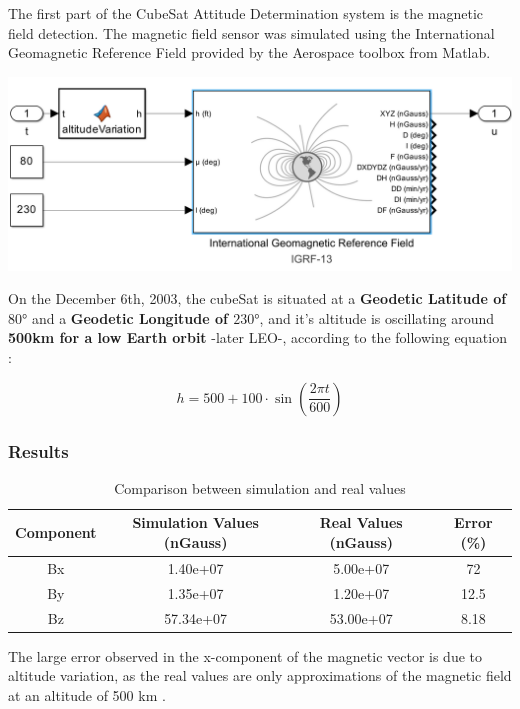 \documentclass[a4paper, 12pt]{article}
\begin{document}
\begin{minipage}{0.3\textwidth}

The first part of the CubeSat Attitude Determination system is the magnetic field detection. The magnetic field sensor was simulated using the International Geomagnetic Reference Field provided by the Aerospace toolbox from Matlab. 


\end{minipage}
\hfill
\begin{minipage}{0.6\textwidth}
    \centering
    \includegraphics[width=\linewidth]{fig/magneticSys.png}
    \label{fig:Magnetic system on Simulink}
\end{minipage}

\vspace{1cm}

On the December 6th, 2003, the cubeSat is situated at a \textbf{Geodetic Latitude of $80°$} and a \textbf{Geodetic Longitude of $230°$}, and it's altitude is oscillating around \textbf{500km for a low Earth orbit} -later LEO-, according to the following equation :

\begin{equation}
h = 500 + 100 \cdot \sin\left( \frac{2\pi t}{600} \right)
\end{equation}


\subsubsection{Results}

\begin{table}[h!]
\centering
\begin{tabular}{|c|c|c|c|}
\hline
\textbf{Component}&\textbf{Simulation Values (nGauss)} & \textbf{Real Values (nGauss)} & \textbf{Error (\%)} \\
\hline
Bx & 1.40e+07 & 5.00e+07 & 72 \\
\hline
By & 1.35e+07  & 1.20e+07  & 12.5 \\
\hline
Bz & 57.34e+07 & 53.00e+07 & 8.18 \\
\hline
\end{tabular}
\caption{Comparison between simulation and real values}
\end{table}
The large error observed in the x-component of the magnetic vector is due to altitude variation, as the real values are only approximations of the magnetic field at an altitude of 500 km \cite{center_ncei_nodate}.
\end{document}

